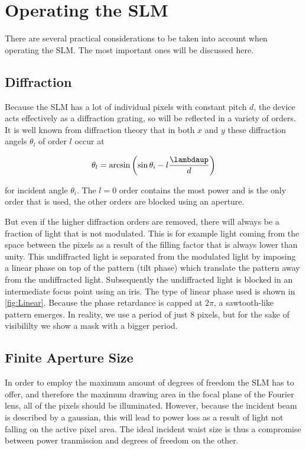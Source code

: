 \section{Operating the SLM}

There are several practical considerations to be taken into account when operating the SLM. 
The most important ones will be discussed here. 

\subsection{Diffraction}\label{subsec:Diffraction}

Because the SLM has a lot of individual pixels with constant pitch $d$, the device acts effectively as a diffraction grating, so will be reflected in a variety of orders. 
It is well known from diffraction theory that in both $x$ and $y$ these diffraction angels $\theta_l$ of order $l$ occur at

\begin{equation}
    \theta_l = \arcsin\left(\sin\theta_i - l\frac{ \lambdaup}{d}\right)
\end{equation}

for incident angle $\theta_i$. 
The $l=0$ order contains the most power and is the only order that is used, the other orders are blocked using an aperture. 

But even if the higher diffraction orders are removed, there will always be a fraction of light that is not modulated. 
This is for example light coming from the space between the pixels as a result of the filling factor that is always lower than unity.
This undiffracted light is separated from the modulated light by imposing a linear phase on top of the pattern (tilt phase) which translate the pattern away from the undiffracted light.
Subsequently the undiffracted light is blocked in an intermediate focus point using an iris.
The type of linear phase used is shown in \cref{fig:Linear}.
Because the phase retardance is capped at $2\pi$, a sawtooth-like pattern emerges.
In reality, we use a period of just 8 pixels, but for the sake of visibililty we show a mask with a bigger period. 

\subsection{Finite Aperture Size}\label{subsec:ApertureSize}

In order to employ the maximum amount of degrees of freedom the SLM has to offer, and therefore the maximum drawing area in the focal plane of the Fourier lens, all of the pixels should be illuminated. 
However, because the incident beam is described by a gaussian, this will lead to power loss as a result of light not falling on the active pixel area. 
The ideal incident waist size is thus a compromise between power tranmission and degrees of freedom on the other.
    
